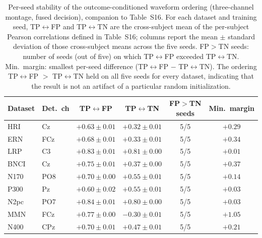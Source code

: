 \begin{table}[t]
\centering
\setlength{\tabcolsep}{6pt}
\caption{%
Per-seed stability of the outcome-conditioned waveform ordering (three-channel montage, fused decision), companion to Table~S16. For each dataset and training seed, TP$\leftrightarrow$FP and TP$\leftrightarrow$TN are the cross-subject mean of the per-subject Pearson correlations defined in Table~S16; columns report the mean $\pm$ standard deviation of those cross-subject means across the five seeds. FP${>}$TN seeds: number of seeds (out of five) on which TP$\leftrightarrow$FP exceeded TP$\leftrightarrow$TN. Min.\ margin: smallest per-seed difference (TP$\leftrightarrow$FP $-$ TP$\leftrightarrow$TN). The ordering TP$\leftrightarrow$FP $>$ TP$\leftrightarrow$TN held on all five seeds for every dataset, indicating that the result is not an artifact of a particular random initialization.%
}
\label{sup:tab-corr-perseed}
\begin{tabular}{llcccc}
\toprule
Dataset & Det.\ ch & TP$\leftrightarrow$FP & TP$\leftrightarrow$TN & FP$>$TN seeds & Min.\ margin \\
\midrule
HRI & Cz & $+0.63 \pm 0.01$ & $+0.32 \pm 0.01$ & 5/5 & $+0.29$ \\
ERN & FCz & $+0.68 \pm 0.01$ & $+0.33 \pm 0.01$ & 5/5 & $+0.34$ \\
LRP & C3 & $+0.83 \pm 0.01$ & $+0.81 \pm 0.00$ & 5/5 & $+0.01$ \\
BNCI & Cz & $+0.75 \pm 0.01$ & $+0.37 \pm 0.00$ & 5/5 & $+0.37$ \\
N170 & PO8 & $+0.70 \pm 0.00$ & $+0.55 \pm 0.01$ & 5/5 & $+0.14$ \\
P300 & Pz & $+0.60 \pm 0.02$ & $+0.55 \pm 0.01$ & 5/5 & $+0.03$ \\
N2pc & PO7 & $+0.84 \pm 0.01$ & $+0.80 \pm 0.00$ & 5/5 & $+0.03$ \\
MMN & FCz & $+0.77 \pm 0.00$ & $-0.30 \pm 0.01$ & 5/5 & $+1.05$ \\
N400 & CPz & $+0.70 \pm 0.01$ & $+0.47 \pm 0.01$ & 5/5 & $+0.21$ \\
\bottomrule
\end{tabular}
\end{table}